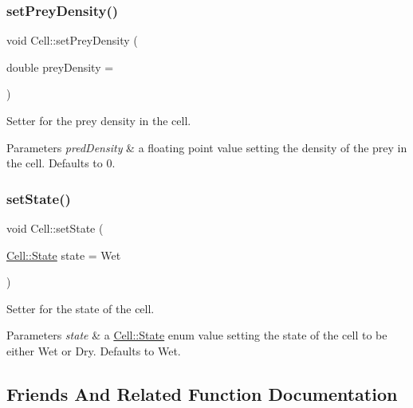 \subsubsection{\texorpdfstring{set\+Prey\+Density()}{setPreyDensity()}}
{\footnotesize\ttfamily void Cell\+::set\+Prey\+Density (\begin{DoxyParamCaption}\item[{double}]{prey\+Density = {} }\end{DoxyParamCaption})}



Setter for the prey density in the cell. 


\begin{DoxyParams}{Parameters}
{\em pred\+Density} & a floating point value setting the density of the prey in the cell. Defaults to 0. \\
\hline
\end{DoxyParams}
\mbox{\label{class_cell_ac388ff95a4d94da1497847ead859f258}} 
\subsubsection{\texorpdfstring{set\+State()}{setState()}}
{\footnotesize\ttfamily void Cell\+::set\+State (\begin{DoxyParamCaption}\item[{\hyperlink{class_cell_a21d74a2efcb79c93e5649b06a50b7cf5}{Cell\+::\+State}}]{state = {\ttfamily Wet} }\end{DoxyParamCaption})}



Setter for the state of the cell. 


\begin{DoxyParams}{Parameters}
{\em state} & a \hyperlink{class_cell_a21d74a2efcb79c93e5649b06a50b7cf5}{Cell\+::\+State} enum value setting the state of the cell to be either Wet or Dry. Defaults to Wet. \\
\hline
\end{DoxyParams}


\subsection{Friends And Related Function Documentation}
\mbox{\label{class_cell_ad4ab80b1b67ca5223d4a0d2de19ba95b}} 
